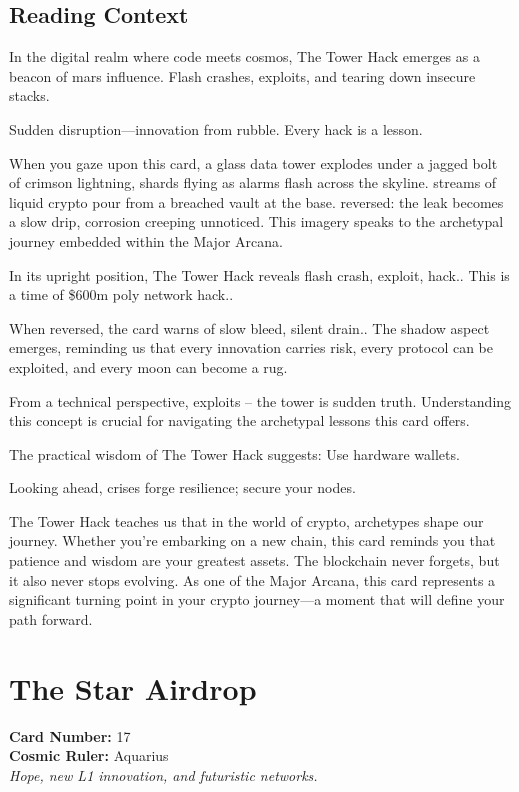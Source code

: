 \documentclass[11pt,oneside]{book}
\begin{document}
\begin{minipage}[t]{0.55\textwidth}
  \subsection*{Reading Context}
  In the digital realm where code meets cosmos, The Tower Hack emerges as a beacon of mars influence. Flash crashes, exploits, and tearing down insecure stacks.

  Sudden disruption—innovation from rubble. Every hack is a lesson.

  When you gaze upon this card, a glass data tower explodes under a jagged bolt of crimson lightning, shards flying as alarms flash across the skyline. streams of liquid crypto pour from a breached vault at the base. reversed: the leak becomes a slow drip, corrosion creeping unnoticed. This imagery speaks to the archetypal journey embedded within the Major Arcana.

  In its upright position, The Tower Hack reveals flash crash, exploit, hack.. This is a time of \$600m poly network hack..

  When reversed, the card warns of slow bleed, silent drain.. The shadow aspect emerges, reminding us that every innovation carries risk, every protocol can be exploited, and every moon can become a rug.

  From a technical perspective, exploits – the tower is sudden truth. Understanding this concept is crucial for navigating the archetypal lessons this card offers.

  The practical wisdom of The Tower Hack suggests: Use hardware wallets.

  Looking ahead, crises forge resilience; secure your nodes.

  The Tower Hack teaches us that in the world of crypto, archetypes shape our journey. Whether you're embarking on a new chain, this card reminds you that patience and wisdom are your greatest assets. The blockchain never forgets, but it also never stops evolving. As one of the Major Arcana, this card represents a significant turning point in your crypto journey—a moment that will define your path forward.

\end{minipage}

\newpage
\section*{The Star Airdrop}

\begin{minipage}[t]{0.55\textwidth}
  \vspace{0pt}
  \textbf{Card Number:} 17\\  \textbf{Cosmic Ruler:} Aquarius\\  \textit{Hope, new L1 innovation, and futuristic networks.}
\end{minipage}
\end{document}
